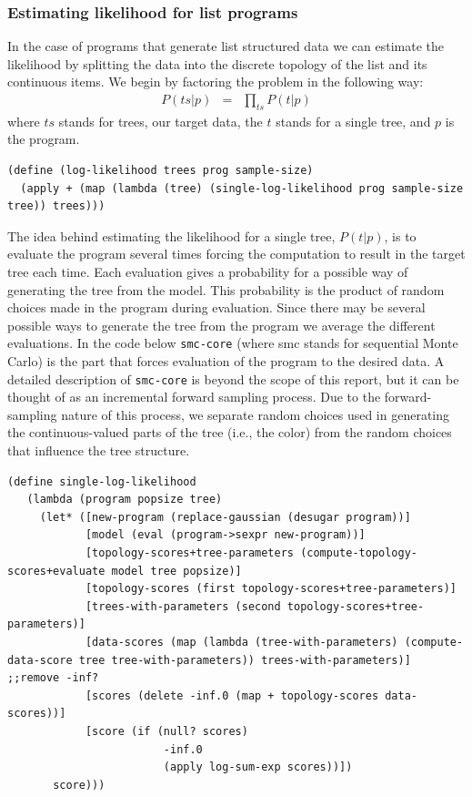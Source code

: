 \documentclass[a4paper,10pt]{article}
\begin{document}
\subsubsection{Estimating likelihood for list programs}
In the case of programs that generate list structured data we can estimate the likelihood by splitting the data into the discrete topology of the list and its continuous items.  We begin by factoring the problem in the following way:
\begin{eqnarray}
P(ts|p) &=& \prod_{ts}P(t|p)
\end{eqnarray}
where $ts$ stands for trees, our target data, the $t$ stands for a single tree, and $p$ is the program.
\begin{lstlisting}[frame=trBL]
(define (log-likelihood trees prog sample-size)
  (apply + (map (lambda (tree) (single-log-likelihood prog sample-size tree)) trees)))
\end{lstlisting}
The idea behind estimating the likelihood for a single tree, $P(t|p)$, is to evaluate the program several times forcing the computation to result in the target tree each time.  Each evaluation gives a probability for a possible way of generating the tree from the model.  This probability is the product of random choices made in the program during evaluation.  Since there may be several possible ways to generate the tree from the program we average the different evaluations.  In the code below \texttt{smc-core} (where smc stands for sequential Monte Carlo) is the part that forces evaluation of the program to the desired data.  A detailed description of \texttt{smc-core} is beyond the scope of this report, but it can be thought of as an incremental forward sampling process.  Due to the forward-sampling nature of this process, we separate random choices used in generating the continuous-valued parts of the tree (i.e., the color) from the random choices that influence the tree structure.
\begin{lstlisting}[frame=trBL]
(define single-log-likelihood 
   (lambda (program popsize tree)
     (let* ([new-program (replace-gaussian (desugar program))]
            [model (eval (program->sexpr new-program))]
            [topology-scores+tree-parameters (compute-topology-scores+evaluate model tree popsize)]
            [topology-scores (first topology-scores+tree-parameters)]
            [trees-with-parameters (second topology-scores+tree-parameters)]
            [data-scores (map (lambda (tree-with-parameters) (compute-data-score tree tree-with-parameters)) trees-with-parameters)] ;;remove -inf?
            [scores (delete -inf.0 (map + topology-scores data-scores))]
            [score (if (null? scores)
                        -inf.0
                        (apply log-sum-exp scores))])
       score)))
\end{lstlisting}
\end{document}
